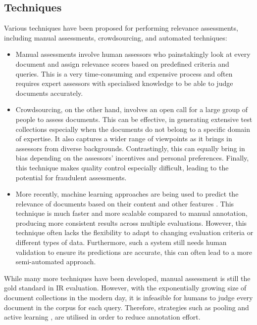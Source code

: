 \documentclass{l4proj}
\begin{document}
\subsection{Techniques}
Various techniques have been proposed for performing relevance assessments, including manual assessments, crowdsourcing, and automated techniques:
\begin{itemize}
    \item Manual assessments involve human assessors who painstakingly look at every document and assign relevance scores based on predefined criteria and queries. This is a very time-consuming and expensive process and often requires expert assessors with specialised knowledge to be able to judge documents accurately. 

    \item Crowdsourcing, on the other hand, involves an open call for a large group of people to assess documents. This can be effective, in generating extensive test collections especially when the documents do not belong to a specific domain of expertise. It also captures a wider range of viewpoints as it brings in assessors from diverse backgrounds. Contrastingly, this can equally bring in bias depending on the assessors' incentives and personal preferences. Finally, this technique makes quality control especially difficult, leading to the potential for fraudulent assessments.
    
    \item More recently, machine learning approaches are being used to predict the relevance of documents based on their content and other features \citep{cao2007ltr}. This technique is much faster and more scalable compared to manual annotation, producing more consistent results across multiple evaluations. However, this technique often lacks the flexibility to adapt to changing evaluation criteria or different types of data. Furthermore, such a system still needs human validation to ensure its predictions are accurate, this can often lead to a more semi-automated approach.
\end{itemize}

While many more techniques have been developed, manual assessment is still the gold standard in IR evaluation. However, with the exponentially growing size of document collections in the modern day, it is infeasible for humans to judge every document in the corpus for each query. Therefore, strategies such as pooling and active learning \citep{rahman2020testal}, are utilised in order to reduce annotation effort.
\end{document}
